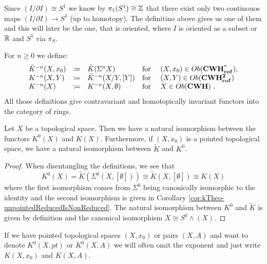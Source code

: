 \begin{remark}
	Since $(I/\partial I)\cong S^1$ we know by $\pi_1(S^1)\cong \mathbb{Z}$ that there exist only two continouos maps $(I/\partial I)\to S^1$ (up to homotopy). The definitino above gives us one of them and this will later be the one, that is oriented, where $I$ is oriented as a subset or $\mathbb{R}$ and $S^1$ via $\pi_S$. 
\end{remark}





\begin{definition} \label{def:kTheo-lowerKGroub}
	For $n\geq 0$ we define:
	\begin{align*}
		\begin{array}{lclll}
			\Tilde{K}^{-n}(X,x_0)&\coloneq &\Tilde{K}(\Sigma^n X)& \text{for } &(X,x_0)\in Ob(\operatorname{\mathbf{CWH^*_{cof}}}),\\
			K^{-n}(X,Y)&\coloneq &\Tilde{K}^{-n}(X\slash Y,[Y]) &\text{for } &(X,Y)\in Ob(\operatorname{\mathbf{CWH^{2}_{cof}}})\\
			K^{-n}(X) &\coloneq &K^{-n}(X,\emptyset) &\text{for } &X\in Ob(\operatorname{\mathbf{CWH}})~.
		\end{array}
	\end{align*}
	All those definitions give contravariant and homotopically invariant functors into the category of rings.
\end{definition}
\begin{corollary}\label{cor:kTheo-K(X)istK(X,nix)}
	Let $X$ be a topological space. Then we have a natural isomorphism between the functors $K^0(X)$ and $K(X)$. Furthermore, if $(X,x_0)$ is a pointed topological space, we have a natural isomorphism between $\tilde{K}$ and $K^0$.
\end{corollary}
\begin{proof}
	When disentangling the definitions, we see that 
	\begin{equation*}
		K^0(X)=\tilde{K}(\Sigma^0(X,[\emptyset]))\cong \tilde{K}(X,[\emptyset])\cong K(X)
	\end{equation*} where the first isomorphism comes from $\Sigma^0$ being canonically isomorphic to the identity and the second isomorphism is given in Corollary \ref{cor:kTheo-unpointedReducedIsNonReduced}. The natural isomorphism between $K^0$ and $\tilde{K}$ is given by definition and the canonical isomorphism $X\cong S^0 \wedge (X)$.
\end{proof}
\begin{remark}
	If we have pointed topological spaces $(X,x_0)$ or pairs $(X,A)$ and want to denote $K^0(X,pt)$ or $K^0(X,A)$ we will often omit the exponent and just write $K(X,x_0)$ and $K(X,A)$.
\end{remark}
